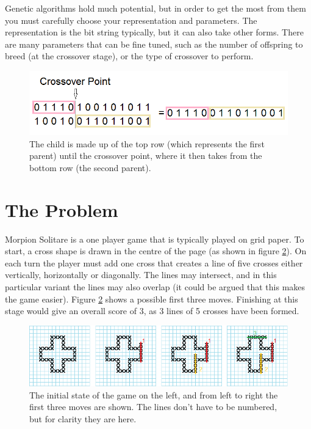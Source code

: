 \documentclass[]{report}
\begin{document}
Genetic algorithms hold much potential, but in order to get the most from them you must carefully choose your representation and parameters. The representation is the bit string typically, but it can also take other forms. There are many parameters that can be fine tuned, such as the number of offspring to breed (at the crossover stage), or the type of crossover to perform.

\begin{figure}[h!]
	\begin{center}
		\includegraphics[scale=0.4]{figures/crossover.png}
		\caption{The child is made up of the top row (which represents the first parent) until the crossover point, where it then takes from the bottom row (the second parent).}
		\label{crossoverFigure}
	\end{center}
\end{figure}

\section{The Problem}

Morpion Solitare is a one player game that is typically played on grid paper. To start, a cross shape is drawn in the centre of the page (as shown in figure \ref{morpionSolitare}). On each turn the player must add one cross that creates a line of five crosses either vertically, horizontally or diagonally. The lines may intersect, and in this particular variant the lines may also overlap (it could be argued that this makes the game easier). Figure \ref{morpionSolitare} shows a possible first three moves. Finishing at this stage would give an overall score of 3, as 3 lines of 5 crosses have been formed.\\

\begin{figure}
	\centering
	\includegraphics[width=\textwidth]{figures/combinedthreemoves.png}
	\caption{The initial state of the game on the left, and from left to right the first three moves are shown. The lines don't have to be numbered, but for clarity they are here.}
	\label{morpionSolitare}
\end{figure}
\end{document}
